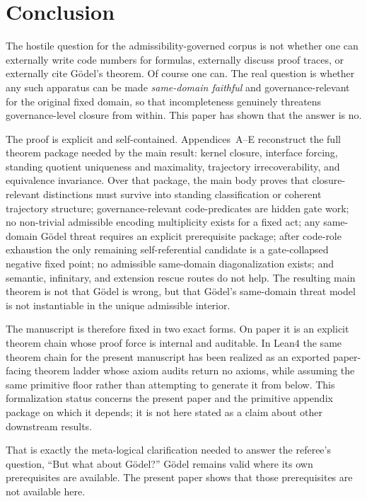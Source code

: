\documentclass[11pt]{article}
\theoremstyle{plain}
\theoremstyle{definition}
\begin{document}
\section{Conclusion}

The hostile question for the admissibility-governed corpus is not whether one can externally write code numbers for formulas, externally discuss proof traces, or externally cite G\"odel's theorem. Of course one can. The real question is whether any such apparatus can be made \emph{same-domain faithful} and governance-relevant for the original fixed domain, so that incompleteness genuinely threatens governance-level closure from within. This paper has shown that the answer is no.

The proof is explicit and self-contained. Appendices~A--E reconstruct the full theorem package needed by the main result: kernel closure, interface forcing, standing quotient uniqueness and maximality, trajectory irrecoverability, and equivalence invariance. Over that package, the main body proves that closure-relevant distinctions must survive into standing classification or coherent trajectory structure; governance-relevant code-predicates are hidden gate work; no non-trivial admissible encoding multiplicity exists for a fixed act; any same-domain G\"odel threat requires an explicit prerequisite package; after code-role exhaustion the only remaining self-referential candidate is a gate-collapsed negative fixed point; no admissible same-domain diagonalization exists; and semantic, infinitary, and extension rescue routes do not help. The resulting main theorem is not that G\"odel is wrong, but that G\"odel's same-domain threat model is not instantiable in the unique admissible interior.

The manuscript is therefore fixed in two exact forms. On paper it is an explicit theorem chain whose proof force is internal and auditable. In Lean4 the same theorem chain for the present manuscript has been realized as an exported paper-facing theorem ladder whose axiom audits return no axioms, while assuming the same primitive floor rather than attempting to generate it from below. This formalization status concerns the present paper and the primitive appendix package on which it depends; it is not here stated as a claim about other downstream results.

That is exactly the meta-logical clarification needed to answer the referee's question, ``But what about G\"odel?'' G\"odel remains valid where its own prerequisites are available. The present paper shows that those prerequisites are not available here.
\end{document}
